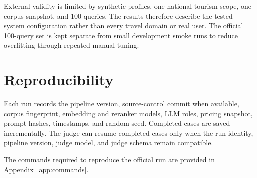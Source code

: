 External validity is limited by synthetic profiles, one national tourism scope,
one corpus snapshot, and 100 queries. The results therefore describe the tested
system configuration rather than every travel domain or real user. The official
100-query set is kept separate from small development smoke runs to reduce
overfitting through repeated manual tuning.

\section{Reproducibility}

Each run records the pipeline version, source-control commit when available,
corpus fingerprint, embedding and reranker models, LLM roles, pricing snapshot,
prompt hashes, timestamps, and random seed. Completed cases are saved
incrementally. The judge can resume completed cases only when the run identity,
pipeline version, judge model, and judge schema remain compatible.

The commands required to reproduce the official run are provided in
Appendix~\ref{app:commands}.


